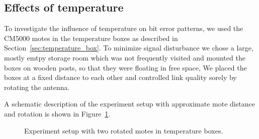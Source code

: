 \subsection{Effects of temperature}
\label{subsec:effects_of_temperature}

To investigate the influence of temperature on bit error patterns, we used the CM5000 motes in the temperature boxes as described in Section~\ref{sec:temperature_box}.
To minimize signal disturbance we chose a large, mostly emtpy storage room which was not frequently visited and mounted the boxes on wooden posts, so that they were floating in free space, 
We placed the boxes at a fixed distance to each other and controlled link quality sorely by rotating the antenna.



A schematic description of the experiment setup with approximate mote distance and rotation is shown in Figure~\ref{fig:2mote_experiment_setup}.


\begin{figure}[H]
	\centering
	\caption{Experiment setup with two rotated motes in temperature boxes.}
	\label{fig:2mote_experiment_setup}
\end{figure}

